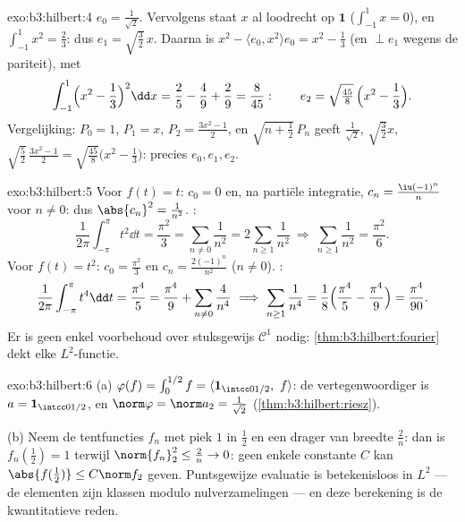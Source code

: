\begin{solution}{exo:b3:hilbert:4}
$e_0 = \frac1{\sqrt2}$. Vervolgens staat $x$ al loodrecht op
$\mathbf 1$ ($\int_{-1}^1x = 0$), en $\int_{-1}^1x^2 = \frac23$:
dus $e_1 = \sqrt{\tfrac32}\,x$. Daarna is $x^2 - \langle e_0,
x^2\rangle e_0 = x^2 - \frac13$ (en $\perp e_1$ wegens de
pariteit), met
\[
\int_{-1}^1\Bigl(x^2 - \frac13\Bigr)^2\dd x = \frac25 -
\frac49 + \frac29 = \frac{8}{45}:
\qquad e_2 = \sqrt{\tfrac{45}8}\,\Bigl(x^2 - \frac13\Bigr).
\]
Vergelijking: $P_0 = 1$, $P_1 = x$, $P_2 = \frac{3x^2 - 1}2$, en
$\sqrt{n + \tfrac12}\,P_n$ geeft $\frac1{\sqrt2}$,
$\sqrt{\frac32}x$, $\sqrt{\frac52}\,\frac{3x^2-1}2 =
\sqrt{\frac{45}8}\bigl(x^2 - \frac13\bigr)$: precies $e_0, e_1,
e_2$.
\end{solution}

\begin{solution}{exo:b3:hilbert:5}
Voor $f(t) = t$: $c_0 = 0$ en, na partiële integratie, $c_n =
\frac{\iu(-1)^n}{n}$ voor $n \neq 0$: dus $\abs{c_n}^2 =
\frac1{n^2}$. :
\[
\frac1{2\pi}\int_{-\pi}^\pi t^2\dd t = \frac{\pi^2}3
= \sum_{n\neq0}\frac1{n^2} = 2\sum_{n\geq1}\frac1{n^2}
\ \Longrightarrow\ \sum_{n\geq1}\frac1{n^2} = \frac{\pi^2}6 .
\]
Voor $f(t) = t^2$: $c_0 = \frac{\pi^2}3$ en $c_n =
\frac{2(-1)^n}{n^2}$ ($n \ne 0$). :
\[
\frac1{2\pi}\int_{-\pi}^{\pi}t^4\dd t = \frac{\pi^4}5
= \frac{\pi^4}9 + \sum_{n\neq0}\frac4{n^4}
\ \Longrightarrow\
\sum_{n\geq1}\frac1{n^4} = \frac18\Bigl(\frac{\pi^4}5 -
\frac{\pi^4}9\Bigr) = \frac{\pi^4}{90} .
\]
Er is geen enkel voorbehoud over stuksgewijs $\mathcal C^1$
nodig: \cref{thm:b3:hilbert:fourier} dekt elke $L^2$-functie.
\end{solution}

\begin{solution}{exo:b3:hilbert:6}
(a) $\varphi(f) = \int_0^{1/2}f = \langle\mathbf
1_{\intcc0{1/2}},\ f\rangle$: de vertegenwoordiger is $a =
\mathbf 1_{\intcc0{1/2}}$, en $\norm\varphi = \norm a_2 =
\frac1{\sqrt2}$ (\cref{thm:b3:hilbert:riesz}).

(b) Neem de tentfuncties $f_n$ met piek $1$ in $\frac12$ en een
drager van breedte $\frac2n$: dan is $f_n(\tfrac12) = 1$ terwijl
$\norm{f_n}_2^2 \leq \frac2n \to 0$: geen enkele constante $C$
kan $\abs{f(\frac12)} \leq C\norm f_2$ geven. Puntsgewijze
evaluatie is betekenisloos in $L^2$ --- de elementen zijn klassen
modulo nulverzamelingen --- en deze berekening is de
kwantitatieve reden.
\end{solution}

